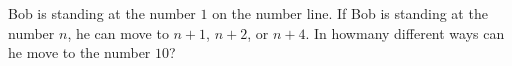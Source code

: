 Bob is standing at the number $1$ on the number line. If Bob is standing at the number $n$, he can move to $n +1$, $n +2$, or $n +4$. In howmany different ways can he move to the number $10$?
